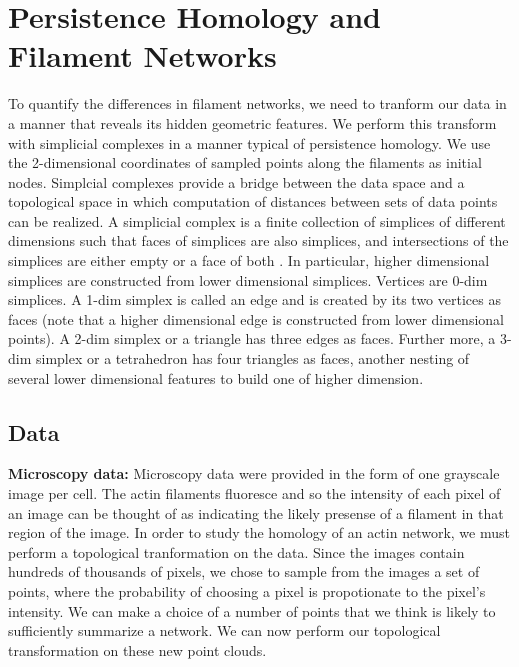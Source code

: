 \documentclass[10pt]{article}
\begin{document}
\section{Persistence Homology and Filament Networks}
To quantify the differences in filament networks, we need to tranform our data in a manner that reveals its hidden geometric features. We perform this transform with simplicial complexes in a manner typical of persistence homology. We use the 2-dimensional coordinates of sampled points along the filaments as initial nodes. Simplcial complexes provide a bridge between the data space and a topological space in which computation of distances between sets of data points can be realized. A simplicial complex is a finite collection of simplices of different dimensions such that faces of simplices are also simplices, and intersections of the simplices are either empty or a face of both \cite{edelsbrunner2010computational}. In particular, higher dimensional simplices are constructed from lower dimensional simplices. Vertices are 0-dim simplices. A 1-dim simplex is called an edge and is created by its two vertices as faces (note that a higher dimensional edge is constructed from lower dimensional points). A 2-dim simplex or a triangle has three edges as faces. Further more, a 3-dim simplex or a tetrahedron has four triangles as faces, another nesting of several lower dimensional features to build one of higher dimension.


\subsection{Data}

\textbf{Microscopy data:}
Microscopy data were provided in the form of one grayscale image per cell. The actin filaments fluoresce and so the intensity of each pixel of an image can be thought of as indicating the likely presense of a filament in that region of the image. In order to study the homology of an actin network, we must perform a topological tranformation on the data. Since the images contain hundreds of thousands of pixels, we chose to sample from the images a set of points, where the probability of choosing a pixel is propotionate to the pixel's intensity. We can make a choice of a number of points that we think is likely to sufficiently summarize a network. We can now perform our topological transformation on these new point clouds.
\end{document}
